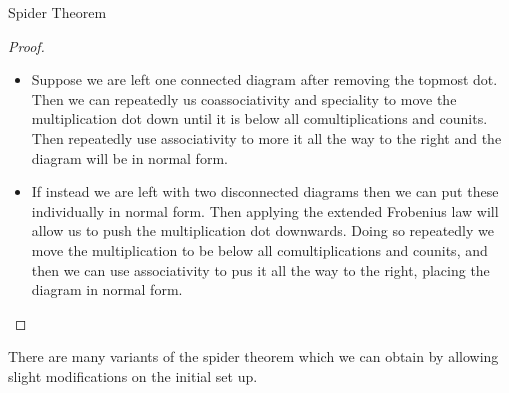 \documentclass[fleqn]{NotesClass}
\begin{document}
\begin{thm}{Spider Theorem}{}
\begin{proof}
\begin{itemize}
                \begin{itemize}
                    \item Suppose we are left one connected diagram after removing the topmost dot.
                    Then we can repeatedly us coassociativity and speciality to move the multiplication dot down until it is below all comultiplications and counits.
                    Then repeatedly use associativity to more it all the way to the right and the diagram will be in normal form.
                    \item If instead we are left with two disconnected diagrams then we can put these individually in normal form.
                    Then applying the extended Frobenius law will allow us to push the multiplication dot downwards.
                    Doing so repeatedly we move the multiplication to be below all comultiplications and counits, and then we can use associativity to pus it all the way to the right, placing the diagram in normal form.
                \end{itemize}
            \end{itemize}
        \end{proof}
    \end{thm}
    
    There are many variants of the spider theorem which we can obtain by allowing slight modifications on the initial set up.
    
\end{document}
